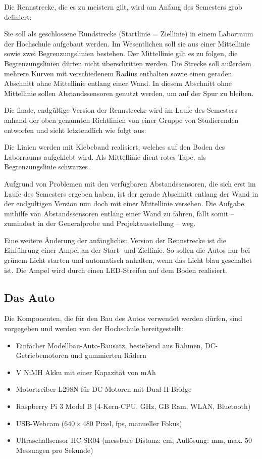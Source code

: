\documentclass[a4paper, 12pt]{scrartcl}
\begin{document}
Die Rennstrecke, die es zu meistern gilt, wird am Anfang des Semesters grob definiert:

Sie soll als geschlossene Rundstrecke (Startlinie = Ziellinie) in einem Laborraum der Hochschule aufgebaut werden. Im Wesentlichen soll sie aus einer Mittellinie sowie zwei Begrenzungslinien bestehen. Der Mittellinie gilt es zu folgen, die Begrenzungslinien dürfen nicht überschritten werden. Die Strecke soll außerdem mehrere Kurven mit verschiedenem Radius enthalten sowie einen geraden Abschnitt ohne Mittellinie entlang einer Wand. In diesem Abschnitt ohne Mittellinie sollen Abstandssensoren genutzt werden, um auf der Spur zu bleiben.

Die finale, endgültige Version der Rennstrecke wird im Laufe des Semesters anhand der oben genannten Richtlinien von einer Gruppe von Studierenden entworfen und sieht letztendlich wie folgt aus: 

Die Linien werden mit Klebeband realisiert, welches auf den Boden des Laborraums aufgeklebt wird. Als Mittellinie dient rotes Tape, als Begrenzungslinie schwarzes.

Aufgrund von Problemen mit den verfügbaren Abstandssensoren, die sich erst im Laufe des Semesters ergeben haben, ist der gerade Abschnitt entlang der Wand in der endgültigen Version nun doch mit einer Mittellinie versehen. Die Aufgabe, mithilfe von Abstandssensoren entlang einer Wand zu fahren, fällt somit -- zumindest in der Generalprobe und Projektausstellung -- weg.

Eine weitere Änderung der anfänglichen Version der Rennstrecke ist die Einführung einer Ampel an der Start- und Ziellinie. So sollen die Autos nur bei grünem Licht starten und automatisch anhalten, wenn das Licht blau geschaltet ist. Die Ampel wird durch einen LED-Streifen auf dem Boden realisiert.

\subsection{Das Auto}
Die Komponenten, die für den Bau des Autos verwendet werden dürfen, sind vorgegeben und werden von der Hochschule bereitgestellt:

\begin{itemize}
	\item Einfacher Modellbau-Auto-Bausatz, bestehend aus Rahmen, DC-Getriebemotoren und gummierten Rädern
	\item \unit[7,2]{V} NiMH Akku mit einer Kapazität von \unit[4000]{mAh}
	\item Motortreiber L298N für DC-Motoren mit Dual H-Bridge
	\item Raspberry Pi 3 Model B (4-Kern-CPU, \unit[1,2]{GHz}, \unit[1]{GB} Ram, WLAN, Bluetooth)
	\item USB-Webcam ($640\times 480$ Pixel, \unit[30]{fps}, manueller Fokus)
	\item Ultraschallsensor HC-SR04 (messbare Distanz: \unit[2--300]{cm}, Auflösung: \unit[3]{mm}, max. 50 Messungen pro Sekunde)
\end{itemize}
\end{document}
